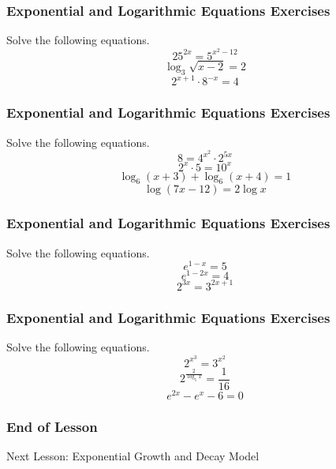 \documentclass[xcolor=dvipsnames]{beamer}
\begin{document}
\begin{frame}
  \frametitle{Exponential and Logarithmic Equations Exercises}
  {\ubung} Solve the following equations.
  \begin{equation}
    \label{eq:eefohvoh}
    25^{2x}=5^{x^{2}-12}
  \end{equation}
  \begin{equation}
    \label{eq:xiefepib}
    \log_{3}\sqrt{x-2}=2
  \end{equation}
  \begin{equation}
    \label{eq:eegaifah}
    2^{x+1}\cdot{}8^{-x}=4
  \end{equation}
\end{frame}

\begin{frame}
  \frametitle{Exponential and Logarithmic Equations Exercises}
  {\ubung} Solve the following equations.
  \begin{equation}
    \label{eq:phahmobu}
    8=4^{x^{2}}\cdot{}2^{5x}
  \end{equation}
  \begin{equation}
    \label{eq:xonguoge}
    2^{x}\cdot{}5=10^{x}
  \end{equation}
  \begin{equation}
    \label{eq:aeshaite}
    \log_{6}(x+3)+\log_{6}(x+4)=1
  \end{equation}
  \begin{equation}
    \label{eq:eequabae}
    \log(7x-12)=2\log{}x
  \end{equation}
\end{frame}

\begin{frame}
  \frametitle{Exponential and Logarithmic Equations Exercises}
  {\ubung} Solve the following equations.
  \begin{equation}
    \label{eq:niephait}
    e^{1-x}=5
  \end{equation}
  \begin{equation}
    \label{eq:eophooki}
    e^{1-2x}=4
  \end{equation}
  \begin{equation}
    \label{eq:eevaicei}
    2^{3x}=3^{2x+1}
  \end{equation}
\end{frame}

\begin{frame}
  \frametitle{Exponential and Logarithmic Equations Exercises}
  {\ubung} Solve the following equations.
  \begin{equation}
    \label{eq:ohquaiva}
    2^{x^{3}}=3^{x^{2}}
  \end{equation}
  \begin{equation}
    \label{eq:poikeeng}
    2^{\frac{2}{\log_{5}x}}=\frac{1}{16}
  \end{equation}
\begin{equation}
  \label{eq:haesiiro}
  e^{2x}-e^{x}-6=0
\end{equation}
\end{frame}

\begin{frame}
  \frametitle{End of Lesson}
Next Lesson: Exponential Growth and Decay Model
\end{frame}
\end{document}
